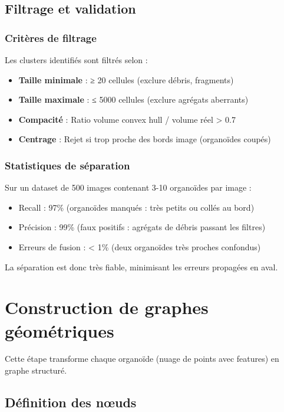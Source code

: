 \subsection{Filtrage et validation}

\subsubsection{Critères de filtrage}

Les clusters identifiés sont filtrés selon :
\begin{itemize}
    \item \textbf{Taille minimale} : ≥ 20 cellules (exclure débris, fragments)
    \item \textbf{Taille maximale} : ≤ 5000 cellules (exclure agrégats aberrants)
    \item \textbf{Compacité} : Ratio volume convex hull / volume réel > 0.7
    \item \textbf{Centrage} : Rejet si trop proche des bords image (organoïdes coupés)
\end{itemize}

\subsubsection{Statistiques de séparation}

Sur un dataset de 500 images contenant 3-10 organoïdes par image :
\begin{itemize}
    \item Recall : 97\% (organoïdes manqués : très petits ou collés au bord)
    \item Précision : 99\% (faux positifs : agrégats de débris passant les filtres)
    \item Erreurs de fusion : < 1\% (deux organoïdes très proches confondus)
\end{itemize}

La séparation est donc très fiable, minimisant les erreurs propagées en aval.

\section{Construction de graphes géométriques}

Cette étape transforme chaque organoïde (nuage de points avec features) en graphe structuré.

\subsection{Définition des nœuds}

